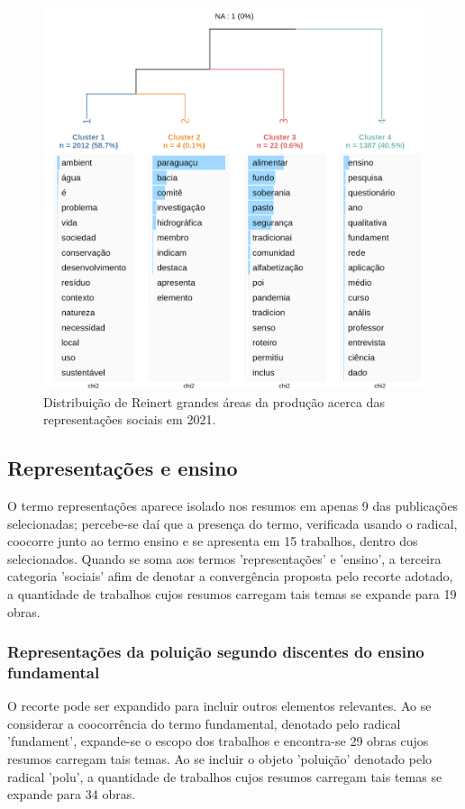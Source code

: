 \documentclass[
   article,       %
   11pt,          %
   oneside,       %
   a4paper,       %
   english,       %
   brazil,           %
   sumario=tradicional
   ]{abntex2}
\begin{document}
\begin{figure}
   \caption{Distribuição de Reinert grandes áreas da produção acerca das representações sociais em 2021.}
   \begin{center}
       \includegraphics[width=120mm,scale=1]{resumes_reinert.png}
   \end{center}
\end{figure}

\subsection{Representações e ensino}
O termo representações aparece isolado nos resumos em apenas 9 das publicações selecionadas; percebe-se daí que a presença do termo, verificada usando o radical, coocorre junto ao termo ensino e se apresenta em 15 trabalhos, dentro dos selecionados.
Quando se soma aos termos 'representações' e 'ensino', a terceira categoria 'sociais' afim de denotar a convergência proposta pelo recorte adotado, a quantidade de trabalhos cujos resumos carregam tais temas se expande para 19 obras.


\subsubsection{Representações da poluição segundo discentes do ensino fundamental}
O recorte pode ser expandido para incluir outros elementos relevantes. Ao se considerar a coocorrência do termo fundamental, denotado pelo radical 'fundament', expande-se o escopo dos trabalhos e encontra-se 29 obras cujos resumos carregam tais temas. Ao se incluir o objeto 'poluição' denotado pelo radical 'polu', a quantidade de trabalhos cujos resumos carregam tais temas se expande para 34 obras. 
\end{document}
